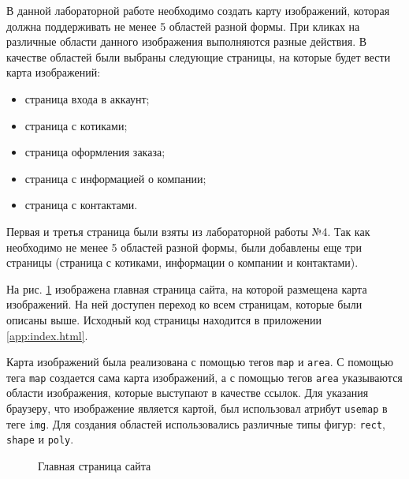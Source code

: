 \documentclass[a4paper, 14pt]{extarticle}
\begin{document}
В данной лабораторной работе необходимо создать карту изображений, которая
должна поддерживать не менее 5 областей разной формы. При кликах на различные
области данного изображения выполняются разные действия. В качестве областей
были выбраны следующие страницы, на которые будет вести карта изображений:
\begin{itemize}
  \item страница входа в аккаунт;
  \item страница с котиками;
  \item страница оформления заказа;
  \item страница с информацией о компании;
  \item страница с контактами.
\end{itemize}
Первая и третья страница были взяты из лабораторной работы №4. Так как
необходимо не менее 5 областей разной формы, были добавлены еще три страницы
(страница с котиками, информации о компании и контактами).

На рис. \ref{fig:index} изображена главная страница сайта, на которой размещена
карта изображений. На ней доступен переход ко всем страницам, которые были
описаны выше. Исходный код страницы находится в приложении \ref{app:index.html}.

Карта изображений была реализована с помощью тегов \texttt{map} и \texttt{area}.
С помощью тега \texttt{map} создается сама карта изображений, а с помощью тегов
\texttt{area} указываются области изображения, которые выступают в качестве
ссылок. Для указания браузеру, что изображение является картой, был использовал
атрибут \texttt{usemap} в теге \texttt{img}. Для создания областей
использовались различные типы фигур: \texttt{rect}, \texttt{shape} и
\texttt{poly}.

\begin{figure}[H]
  \centering
  \caption{Главная страница сайта}
  \label{fig:index}
\end{figure}
\end{document}
